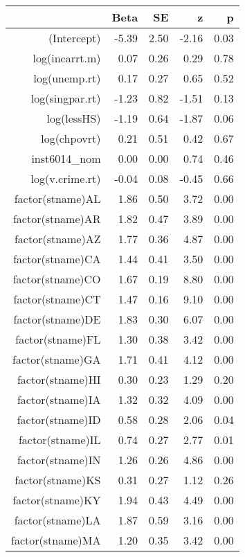 \begin{table}[ht]
\centering
\begin{tabular}{rrrrr}
  \hline
 & Beta & SE & z & p \\ 
  \hline
(Intercept) & -5.39 & 2.50 & -2.16 & 0.03 \\ 
  log(incarrt.m) & 0.07 & 0.26 & 0.29 & 0.78 \\ 
  log(unemp.rt) & 0.17 & 0.27 & 0.65 & 0.52 \\ 
  log(singpar.rt) & -1.23 & 0.82 & -1.51 & 0.13 \\ 
  log(lessHS) & -1.19 & 0.64 & -1.87 & 0.06 \\ 
  log(chpovrt) & 0.21 & 0.51 & 0.42 & 0.67 \\ 
  inst6014\_nom & 0.00 & 0.00 & 0.74 & 0.46 \\ 
  log(v.crime.rt) & -0.04 & 0.08 & -0.45 & 0.66 \\ 
  factor(stname)AL & 1.86 & 0.50 & 3.72 & 0.00 \\ 
  factor(stname)AR & 1.82 & 0.47 & 3.89 & 0.00 \\ 
  factor(stname)AZ & 1.77 & 0.36 & 4.87 & 0.00 \\ 
  factor(stname)CA & 1.44 & 0.41 & 3.50 & 0.00 \\ 
  factor(stname)CO & 1.67 & 0.19 & 8.80 & 0.00 \\ 
  factor(stname)CT & 1.47 & 0.16 & 9.10 & 0.00 \\ 
  factor(stname)DE & 1.83 & 0.30 & 6.07 & 0.00 \\ 
  factor(stname)FL & 1.30 & 0.38 & 3.42 & 0.00 \\ 
  factor(stname)GA & 1.71 & 0.41 & 4.12 & 0.00 \\ 
  factor(stname)HI & 0.30 & 0.23 & 1.29 & 0.20 \\ 
  factor(stname)IA & 1.32 & 0.32 & 4.09 & 0.00 \\ 
  factor(stname)ID & 0.58 & 0.28 & 2.06 & 0.04 \\ 
  factor(stname)IL & 0.74 & 0.27 & 2.77 & 0.01 \\ 
  factor(stname)IN & 1.26 & 0.26 & 4.86 & 0.00 \\ 
  factor(stname)KS & 0.31 & 0.27 & 1.12 & 0.26 \\ 
  factor(stname)KY & 1.94 & 0.43 & 4.49 & 0.00 \\ 
  factor(stname)LA & 1.87 & 0.59 & 3.16 & 0.00 \\ 
  factor(stname)MA & 1.20 & 0.35 & 3.42 & 0.00 \\ 

\end{tabular}
\end{table}
